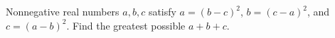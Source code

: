 Nonnegative real numbers $a,b,c$ satisfy $a=(b-c)^2$, $b=(c-a)^2$, and $c=(a-b)^2$. Find the greatest possible $a+b+c$.
